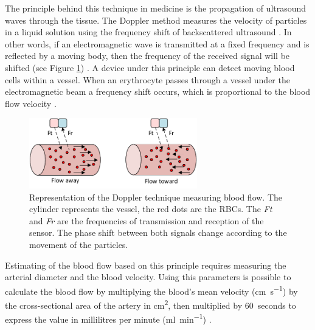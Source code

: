 The principle behind this technique in medicine is the propagation of ultrasound waves through the tissue. The Doppler method measures the velocity of particles in a liquid solution using the frequency shift of backscattered ultrasound \cite{orekhova2013doppler}. In other words, if an electromagnetic wave is transmitted at a fixed frequency and is reflected by a moving body, then the frequency of the received signal will be shifted (see Figure \ref{fig:Doppler method}) \cite{jayanthy2011measuring, casey2008measuring, surgeonhand2002Hand,ht:MD2}. A device under this principle can detect moving blood cells within a vessel. When an erythrocyte passes through a vessel under the electromagnetic beam a frequency shift occurs, which is proportional to the blood flow velocity \cite{gill1979pulsed}.

\begin{figure}[!htpb]
	\centering
	\includegraphics[width=0.65\textwidth,keepaspectratio]{figure5}    
	\caption[Doppler technique to measure flow]{Representation of the Doppler technique measuring blood flow. The cylinder represents the vessel, the red dots are the RBCs. The \textit{Ft} and \textit{Fr} are the frequencies of transmission and reception of the sensor. The phase shift between both signals change according to the movement of the particles.}
	\label{fig:Doppler method}
\end{figure}

Estimating of the blood flow based on this principle requires measuring the arterial diameter and the blood velocity. Using this parameters is possible to calculate the blood flow by multiplying the blood's mean velocity (\si{\cm \per \second}) by the cross-sectional area of the artery in \si{\square \cm}, then multiplied by \SI{60}{seconds} to express the value in millilitres per minute (\si{\milli\litre\per\minute}) \cite{casey2008measuring}. 

